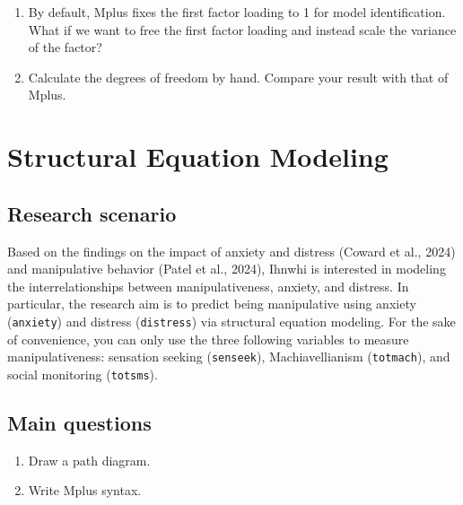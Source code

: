\documentclass[
]{book}
\begin{document}
\begin{enumerate}
\def\labelenumi{\arabic{enumi}.}
\item
  By default, Mplus fixes the first factor loading to 1 for model identification. What if we want to free the first factor loading and instead scale the variance of the factor?
\item
  Calculate the degrees of freedom by hand. Compare your result with that of Mplus.
\end{enumerate}

\hypertarget{structural-equation-modeling}{%
\chapter{Structural Equation Modeling}\label{structural-equation-modeling}}

\hypertarget{research-scenario-2}{%
\section{Research scenario}\label{research-scenario-2}}

Based on the findings on the impact of anxiety and distress (Coward et al., 2024) and manipulative behavior (Patel et al., 2024), Ihnwhi is interested in modeling the interrelationships between manipulativeness, anxiety, and distress. In particular, the research aim is to predict being manipulative using anxiety (\texttt{anxiety}) and distress (\texttt{distress}) via structural equation modeling. For the sake of convenience, you can only use the three following variables to measure manipulativeness: sensation seeking (\texttt{senseek}), Machiavellianism (\texttt{totmach}), and social monitoring (\texttt{totsms}).

\hypertarget{main-questions-2}{%
\section{Main questions}\label{main-questions-2}}

\begin{enumerate}
\def\labelenumi{\arabic{enumi}.}
\item
  Draw a path diagram.
\item
  Write Mplus syntax.
\end{enumerate}
\end{document}
